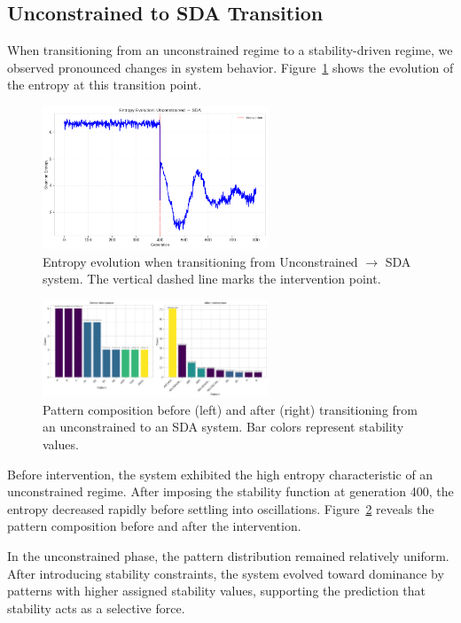 \documentclass[preprint,12pt]{elsarticle}
\begin{document}
\subsection{Unconstrained to SDA Transition}

When transitioning from an unconstrained regime to a stability-driven regime, we observed pronounced changes in system behavior. Figure~\ref{fig:u2s-entropy} shows the evolution of the entropy at this transition point.

\begin{figure}[h]
    \centering
    \includegraphics[width=0.6\textwidth]{figure_6.png}
    \caption{Entropy evolution when transitioning from Unconstrained $\to$ SDA system. The vertical dashed line marks the intervention point.}
    \label{fig:u2s-entropy}
\end{figure}


\begin{figure}[h]
    \centering
    \includegraphics[width=0.6\textwidth]{figure_7.png}
    \caption{Pattern composition before (left) and after (right) transitioning from an unconstrained to an SDA system. Bar colors represent stability values.}
    \label{fig:u2s-patterns}
\end{figure}

Before intervention, the system exhibited the high entropy characteristic of an unconstrained regime. After imposing the stability function at generation 400, the entropy decreased rapidly before settling into oscillations. Figure~\ref{fig:u2s-patterns} reveals the pattern composition before and after the intervention.

In the unconstrained phase, the pattern distribution remained relatively uniform. After introducing stability constraints, the system evolved toward dominance by patterns with higher assigned stability values, supporting the prediction that stability acts as a selective force.
\end{document}
